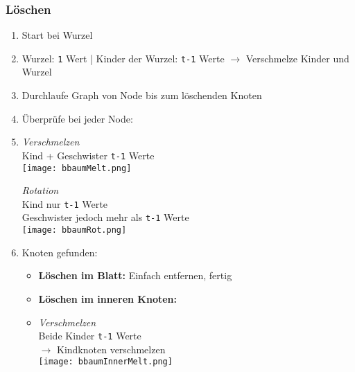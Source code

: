         \subsubsection{Löschen}
            \begin{enumerate}
                \item Start bei Wurzel
                \item[] Wurzel: \texttt{1} Wert | Kinder der Wurzel: \texttt{t-1} Werte $\rightarrow$ Verschmelze Kinder und Wurzel
                \item Durchlaufe Graph von Node bis zum löschenden Knoten
                \item Überprüfe bei jeder Node:
                \item[]
                    \begin{minipage}{0.45\textwidth}
                        \textit{Verschmelzen} \\
                        Kind + Geschwister \texttt{t-1} Werte \\
                        \texttt{[image: bbaumMelt.png]}
                    \end{minipage} 
                    \begin{minipage}{0.45\textwidth}
                    \textit{Rotation} \\
                    Kind nur \texttt{t-1} Werte \\
                    Geschwister jedoch mehr als \texttt{t-1} Werte \\
                    \texttt{[image: bbaumRot.png]}
                    \end{minipage}
                \item Knoten gefunden:
                    \begin{itemize}
                        \item \textbf{Löschen im Blatt:} Einfach entfernen, fertig
                        \item \textbf{Löschen im inneren Knoten:}
                        \item[]
                            \begin{minipage}{0.4\textwidth}
                                \textit{Verschmelzen} \\
                                Beide Kinder \texttt{t-1} Werte \\
                                $\rightarrow$ Kindknoten verschmelzen \\
                                \texttt{[image: bbaumInnerMelt.png]}

\end{minipage}
\end{itemize}
\end{enumerate}
